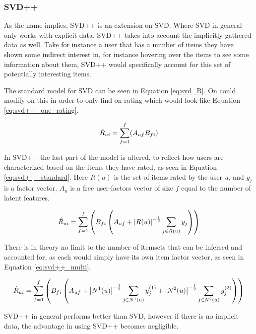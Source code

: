 \subsubsection{SVD++} \label{bg:mf_svd++}
As the name implies, SVD++ is an extension on SVD. Where SVD in general only works with explicit data, SVD++ takes into account the implicitly gathered data as well. Take for instance a user that has a number of items they have shown some indirect interest in, for instance hovering over the items to see some information about them, SVD++ would specifically account for this set of potentially interesting items\cite{svd++}.

The standard model for SVD can be seen in Equation \ref{eq:svd_R}. On could modify on this in order to only find on rating which would look like Equation \ref{eq:svd++_one_rating}.

\begin{equation} \label{eq:svd++_one_rating}
\centering
\hat{R}_{ui} = \sum^f_{f=1}(A_{uf}B_{fi})
\end{equation}

In SVD++ the last part of the model is altered, to reflect how users are characterized based on the items they have rated, as seen in Equation \ref{eq:svd++_standard}. Here $R(u)$ is the set of items rated by the user $u$, and $y_{j}$ is a factor vector. $A_{u}$ is a free user-factors vector of size $f$ equal to the number of latent features.

\begin{equation} \label{eq:svd++_standard}
\centering
\hat{R}_{ui} =\sum^f_{f=1}\left(B_{fi}\left (A_{uf} + \left | R(u) \right |^{-\frac{1}{2}} \sum_{j\in R(u)} y_{j} \right )\right)
\end{equation}

There is in theory no limit to the number of itemsets that can be inferred and accounted for, as each would simply have its own item factor vector, as seen in Equation \ref{eq:svd++_multi}.

\begin{equation} \label{eq:svd++_multi}
\centering
\hat{R}_{ui} = \sum^f_{f=1}\left( B_{fi}\left (A_{uf} + \left | N^{1}(u) \right |^{-\frac{1}{2}} \sum_{j\in N^{1}(u)} y_{j}^{(1)} + \left | N^{2}(u) \right |^{-\frac{1}{2}} \sum_{j\in N^{2}(u)} y_{j}^{(2)} \right )\right)
\end{equation}

SVD++ in general performs better than SVD, however if there is no implicit data, the advantage in using SVD++ becomes negligible.